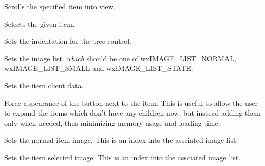 Scrolls the specified item into view.

\label{wxtreectrlselectitem}


Selects the given item.

\label{wxtreectrlsetindent}


Sets the indentation for the tree control.

\label{wxtreectrlsetimagelist}


Sets the image list. {\it which} should be one of wxIMAGE\_LIST\_NORMAL, wxIMAGE\_LIST\_SMALL and
wxIMAGE\_LIST\_STATE.

\label{wxtreectrlsetitemdata}


Sets the item client data.

\label{wxtreectrlsetitemhaschildren}


Force appearance of the button next to the item. This is useful to
allow the user to expand the items which don't have any children now,
but instead adding them only when needed, thus minimizing memory
usage and loading time.

\label{wxtreectrlsetitemimage}


Sets the normal item image. This is an index into the assciated image list.

\label{wxtreectrlsetitemselectedimage}


Sets the item selected image. This is an index into the assciated image list.

